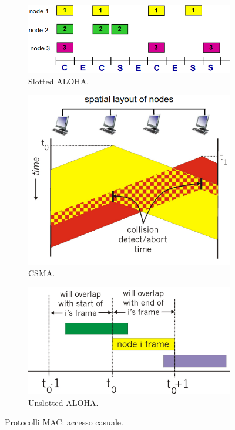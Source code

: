 \documentclass[11pt, italian, openany]{book}
\begin{document}
\begin{sloppypar}
\pagebreak

\begin{figure}[!h]
	\begin{subfigure}[t]{0.33 \linewidth} \centering
		\includegraphics[scale=0.25]{images/link-slotted-aloha.png}
		\caption{Slotted ALOHA.}
	\end{subfigure}
	\begin{subfigure}[t]{0.33 \linewidth} \centering
		\includegraphics[scale=0.2]{images/link-csma.png}
		\caption{CSMA.}
	\end{subfigure}
	\begin{subfigure}[t]{0.33 \linewidth} \centering
		\includegraphics[scale=0.25]{images/link-aloha.png}
		\caption{Unslotted ALOHA.}
	\end{subfigure}
	\caption{Protocolli MAC: accesso casuale.}
	\label{fig:link-accesso-casuale}
\end{figure}


\end{sloppypar}
\end{document}
